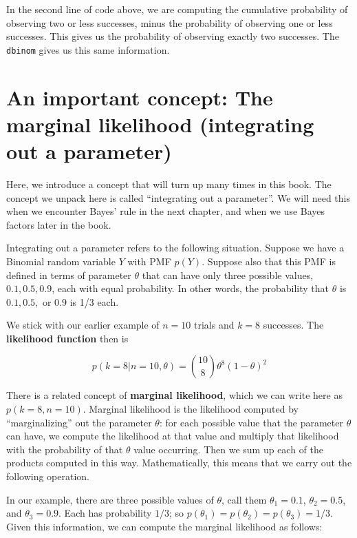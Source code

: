 \documentclass[12pt,]{krantz}
\theoremstyle{definition}
\theoremstyle{definition}
\theoremstyle{definition}
\theoremstyle{remark}
\begin{document}
In the second line of code above, we are computing the cumulative probability of observing two or less successes, minus the probability of observing one or less successes. This gives us the probability of observing exactly two successes. The \texttt{dbinom} gives us this same information.

\hypertarget{an-important-concept-the-marginal-likelihood-integrating-out-a-parameter}{%
\section{An important concept: The marginal likelihood (integrating out a parameter)}\label{an-important-concept-the-marginal-likelihood-integrating-out-a-parameter}}

Here, we introduce a concept that will turn up many times in this book. The concept we unpack here is called ``integrating out a parameter''. We will need this when we encounter Bayes' rule in the next chapter, and when we use Bayes factors later in the book.

Integrating out a parameter refers to the following situation. Suppose we have a Binomial random variable \(Y\) with PMF \(p(Y)\). Suppose also that this PMF is defined in terms of parameter \(\theta\) that can have only three possible values, \(0.1, 0.5, 0.9\), each with equal probability. In other words, the probability that \(\theta\) is \(0.1, 0.5,\) or \(0.9\) is 1/3 each.

We stick with our earlier example of \(n=10\) trials and \(k=8\) successes.
The \textbf{likelihood function} then is

\begin{equation}
p(k=8|n=10,\theta) = \binom{10}{8} \theta^8 (1-\theta)^{2}
\end{equation}

There is a related concept of \textbf{marginal likelihood}, which we can write here as \(p(k=8,n=10)\). Marginal likelihood is the likelihood computed by ``marginalizing'' out the parameter \(\theta\): for each possible value that the parameter \(\theta\) can have, we compute the likelihood at that value and multiply that likelihood with the probability of that \(\theta\) value occurring. Then we sum up each of the products computed in this way. Mathematically, this means that we carry out the following operation.

In our example, there are three possible values of \(\theta\),
call them \(\theta_1=0.1\), \(\theta_2=0.5\), and \(\theta_3=0.9\). Each has probability \(1/3\); so \(p(\theta_1)=p(\theta_2)=p(\theta_3)=1/3\). Given this information, we can compute the marginal likelihood as follows:
\end{document}
